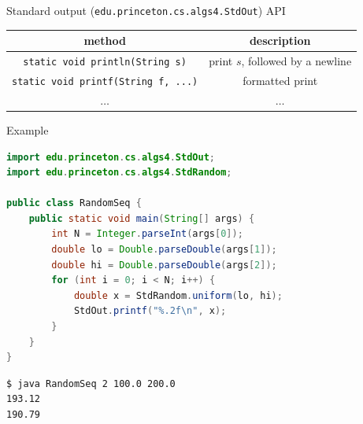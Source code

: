 \documentclass[8pt,a4paper,compress]{beamer}
\begin{document}
\begin{frame}[fragile]
\pause

Standard output (\lstinline{edu.princeton.cs.algs4.StdOut}) API
\begin{center}
\begin{tabular}{cc}
method & description \\ \hline
\lstinline$static void println(String s)$ & print $s$, followed by a newline \\
\lstinline$static void printf(String f, ...)$ & formatted print \\
$\dots$ & $\dots$ 
\end{tabular} 
\end{center}

\pause\bigskip

Example

\smallskip

\begin{lstlisting}[language=Java,style=focusin]
import edu.princeton.cs.algs4.StdOut;
import edu.princeton.cs.algs4.StdRandom;

public class RandomSeq {
    public static void main(String[] args) { 
        int N = Integer.parseInt(args[0]);
        double lo = Double.parseDouble(args[1]);
        double hi = Double.parseDouble(args[2]);
        for (int i = 0; i < N; i++) {
            double x = StdRandom.uniform(lo, hi);
            StdOut.printf("%.2f\n", x);
        }
    }
}
\end{lstlisting}

\pause\bigskip

\begin{lstlisting}[language={},style=focusin]
$ java RandomSeq 2 100.0 200.0
193.12
190.79
\end{lstlisting}
\end{frame}
\end{document}
